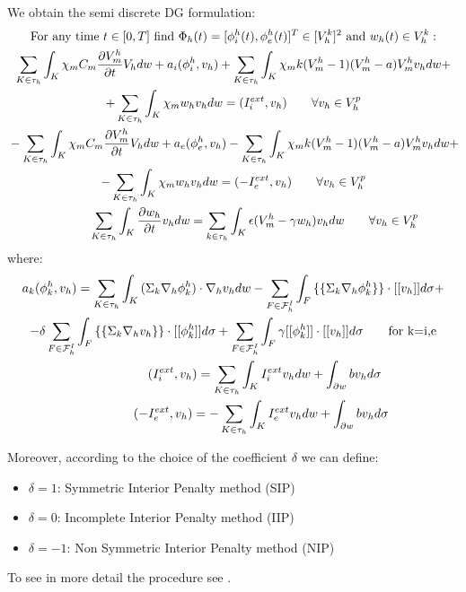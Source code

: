 \documentclass[a4paper,12pt]{article}
\begin{document}
    We obtain the semi discrete DG formulation:
    \begin{equation*}
    \begin{gathered}
    \text{For any time } t \in [0,T] \text{ find } \Phi_h(t)=[\phi_i^h(t),\phi_e^h(t)]^T \in [V_h^k]^2 \text{ and } w_h(t) \in V_h^k:\\
    \sum_{K \in \tau_h} \int_K{ \chi_m C_m \pdv{V_m^h}{t} V_h dw}+a_i(\phi_i^h,v_h)+\sum_{K \in \tau_h} \int_K{ \chi_m k (V_m^h-1)(V_m^h-a) V_m^h v_h dw}+\\
    +\sum_{K \in \tau_h} \int_K{ \chi_m w_h v_h dw}=(I_i^{ext},v_h) \qquad \forall v_h \in V_h^p\\
    \newline
    -\sum_{K \in \tau_h} \int_K{ \chi_m C_m \pdv{V_m^h}{t} V_h dw}+a_e(\phi_e^h,v_h)-\sum_{K \in \tau_h} \int_K{ \chi_m k (V_m^h-1)(V_m^h-a) V_m^h v_h dw}+\\
    -\sum_{K \in \tau_h} \int_K{ \chi_m w_h v_h dw}=(-I_e^{ext},v_h) \qquad \forall v_h \in V_h^p\\
    \newline
    \sum_{K \in \tau_h} \int_K{\pdv{w_h}{t}v_h dw}=\sum_{k \in \tau_h} \int_K{\epsilon (V_m^h-\gamma w_h) v_h dw} \qquad \forall v_h \in V_h^p\\
    \end{gathered}
    \end{equation*}
    where:
    \begin{equation*}
    \begin{gathered}
    a_k(\phi_k^h,v_h)=\sum_{K \in \tau_h} \int_K{(\Sigma_k \nabla_h \phi_k^h) \cdot \nabla_h v_h dw}-\sum_{F \in \mathcal{F}_h^I} \int_F { \{\{\Sigma_k \nabla_h \phi_k^h \}\} \cdot [[v_h]] d\sigma}+\\
    -\delta \sum_{F \in \mathcal{F}_h^I} \int_F{ \{\{\Sigma_k \nabla_h v_h\}\} \cdot [[\phi_k^h]]d\sigma}+\sum_{F \in \mathcal{F}_h^I}\int_F {\gamma [[\phi_k^h]] \cdot [[v_h]] d\sigma} \qquad \text{for k=i,e}\\
    \newline
    (I_i^{ext},v_h)=\sum_{K \in \tau_h} \int_K {I_i^{ext} v_h dw}+\int_{\partial w}{b v_h d\sigma}\\
    \newline
    (-I_e^{ext},v_h)=-\sum_{K \in \tau_h} \int_K {I_e^{ext} v_h dw}+\int_{\partial w}{b v_h d\sigma}
    \end{gathered}
    \end{equation*}
    
    Moreover, according to the choice of the coefficient $\delta$ we can define:
    \begin{itemize}
    \item $\delta=1$: Symmetric Interior Penalty method (SIP)
    \item $\delta=0$: Incomplete Interior Penalty method (IIP)
    \item $\delta=-1$: Non Symmetric Interior Penalty method (NIP) 
    \end{itemize} 
    To see in more detail the procedure see \cite{marta}.
    
\end{document}
